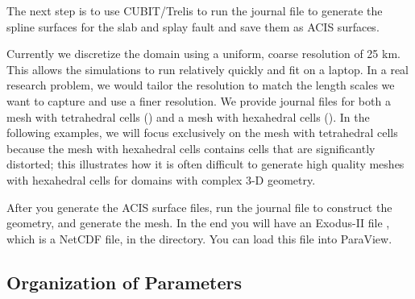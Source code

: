 The next step is to use CUBIT/Trelis to run the
 journal file to generate the spline
surfaces for the slab and splay fault and save them as ACIS
surfaces. 


Currently we discretize the domain using a uniform, coarse resolution
of 25 km. This allows the simulations to run relatively quickly and
fit on a laptop. In a real research problem, we would tailor the
resolution to match the length scales we want to capture and use a
finer resolution. We provide journal files for both a mesh with
tetrahedral cells () and a mesh with
hexahedral cells (). In the following
examples, we will focus exclusively on the mesh with tetrahedral cells
because the mesh with hexahedral cells contains cells that are
significantly distorted; this illustrates how it is often difficult to
generate high quality meshes with hexahedral cells for domains with
complex 3-D geometry.

After you generate the ACIS surface files, run the
 journal file to construct the geometry, and
generate the mesh. In the end you will have an Exodus-II file
, which is a NetCDF file, in the
 directory. You can load this file into ParaView.


\subsection{Organization of Parameters}



